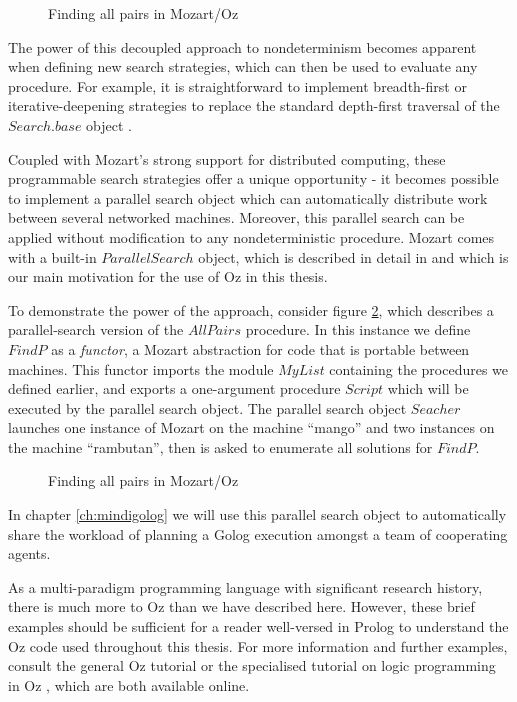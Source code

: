 %
\begin{figure}[t]

\caption{Finding all pairs in Mozart/Oz\label{fig:Background:All-Pairs}}

\end{figure}


The power of this decoupled approach to nondeterminism becomes apparent
when defining new search strategies, which can then be used to evaluate
any procedure. For example, it is straightforward to implement breadth-first
or iterative-deepening strategies to replace the standard depth-first
traversal of the $Search.base$ object \citep{schulte00constraint_services}.

Coupled with Mozart's strong support for distributed computing, these
programmable search strategies offer a unique opportunity - it becomes
possible to implement a parallel search object which can automatically
distribute work between several networked machines. Moreover, this
parallel search can be applied without modification to any nondeterministic
procedure. Mozart comes with a built-in $ParallelSearch$ object,
which is described in detail in \citep{schulte00oz_parallel} and
which is our main motivation for the use of Oz in this thesis.

To demonstrate the power of the approach, consider figure \ref{fig:Background:Parallel-All-Pairs},
which describes a parallel-search version of the $AllPairs$ procedure.
In this instance we define $FindP$ as a \emph{functor}, a Mozart
abstraction for code that is portable between machines. This functor
imports the module $MyList$ containing the procedures we defined
earlier, and exports a one-argument procedure $Script$ which will
be executed by the parallel search object. The parallel search object
$Seacher$ launches one instance of Mozart on the machine {}``mango''
and two instances on the machine {}``rambutan'', then is asked to
enumerate all solutions for $FindP$.

%
\begin{figure}[t]

\caption{Finding all pairs in Mozart/Oz\label{fig:Background:Parallel-All-Pairs}}

\end{figure}


In chapter \ref{ch:mindigolog} we will use this parallel search object
to automatically share the workload of planning a Golog execution
amongst a team of cooperating agents.

As a multi-paradigm programming language with significant research
history, there is much more to Oz than we have described here. However,
these brief examples should be sufficient for a reader well-versed
in Prolog to understand the Oz code used throughout this thesis. For
more information and further examples, consult the general Oz tutorial
\citep{haridi99oz_tutorial} or the specialised tutorial on logic
programming in Oz \citep{lpinoz99}, which are both available online.


